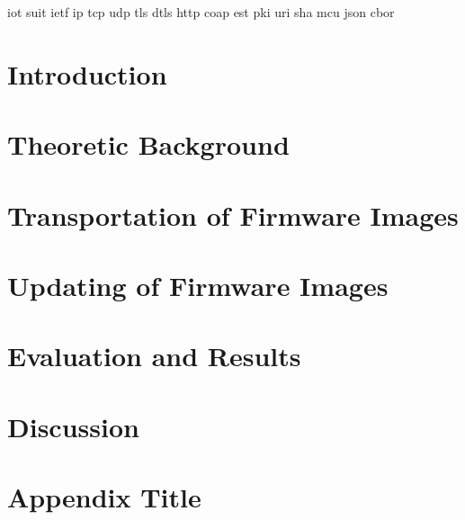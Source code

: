 \documentclass{kththesis}
\begin{document}
\gls{iot}
\gls{suit}
\gls{ietf}
\gls{ip}
\gls{tcp}
\gls{udp}
\gls{tls}
\gls{dtls}
\gls{http}
\gls{coap}
\gls{est}
\gls{pki}
\gls{uri}
\gls{sha}
\gls{mcu}
\gls{json}
\gls{cbor}
\printglossaries

\mainmatter


\chapter{Introduction}


\chapter{Theoretic Background}


\chapter{Transportation of Firmware Images}

\chapter{Updating of Firmware Images}


\chapter{Evaluation and Results}


\chapter{Discussion}


\printbibliography[heading=bibintoc] %

\appendix

\chapter{Appendix Title}
\end{document}
